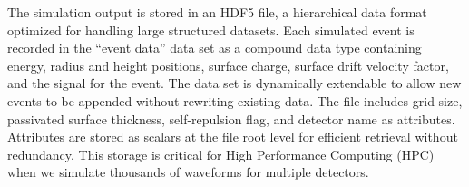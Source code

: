 The simulation output is stored in an HDF5 file, a hierarchical data format optimized for handling large structured datasets. Each simulated event is recorded in the ``event data'' data set as a compound data type containing energy, radius and height positions, surface charge, surface drift velocity factor, and the signal for the event. The data set is dynamically extendable to allow new events to be appended without rewriting existing data. The file includes grid size, passivated surface thickness, self-repulsion flag, and detector name as attributes. Attributes are stored as scalars at the file root level for efficient retrieval without redundancy. This storage is critical for High Performance Computing (HPC) when we simulate thousands of waveforms for multiple detectors.


